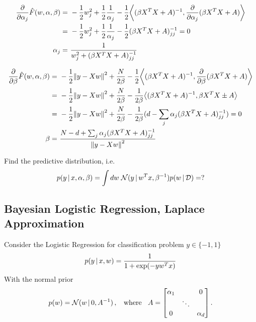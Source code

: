 \begin{align}
    \deriv{}{\alpha_j}\hat{F}(w,\alpha,\beta) =~& -\frac{1}{2}w^2_j + \frac{1}{2}\frac{1}{\alpha_j} - \frac{1}{2} \inner{(\beta X^TX + A)^{-1}}{\deriv{}{\alpha_j}(\beta X^TX + A)} \\
    =~& -\frac{1}{2}w^2_j+ \frac{1}{2}\frac{1}{\alpha_j} - \frac{1}{2} (\beta X^TX + A)^{-1}_{jj} = 0\\
    \alpha_j =~& \frac{1}{w_j^2 + (\beta X^TX + A)^{-1}_{jj}}
\end{align}

\begin{align}
    \deriv{}{\beta}\hat{F}(w,\alpha,\beta) =~& -\frac{1}{2}\norm{y - Xw}^2 + \frac{N}{2\beta} - \frac{1}{2}\inner{(\beta X^TX + A)^{-1}}{\deriv{}{\beta}(\beta X^TX + A)}\\
    =~& -\frac{1}{2}\norm{y - Xw}^2 + \frac{N}{2\beta} - \frac{1}{2\beta}\inner{(\beta X^TX + A)^{-1}}{\beta X^TX \pm A}\\
    =~& -\frac{1}{2}\norm{y - Xw}^2 + \frac{N}{2\beta} - \frac{1}{2\beta}(d - \sum_j\alpha_j (\beta X^TX + A)^{-1}_{jj}) = 0\\
    \beta =~& \frac{N - d + \sum_j\alpha_j (\beta X^TX + A)^{-1}_{jj}}{\norm{y - Xw}^2}
\end{align}

\begin{exercise}
    Find the predictive distribution, i.e.
    \begin{align}
        p(y\,|\, x,\alpha,\beta)= \int dw\; \mathcal{N}(y\,|\, w^Tx, \beta^{-1})p(w\,|\, \mathcal{D}) = ?
    \end{align}
\end{exercise}

\subsection{Bayesian Logistic Regression, Laplace Approximation}

Consider the Logistic Regression for classification problem $y \in \{-1,1\}$
\begin{align}
    p(y\,|\, x,w) = \frac{1}{1+\exp(-yw^Tx)}
\end{align}
With the normal prior
\begin{align}
    p(w) = \Normal(w\cond 0, A^{-1})\,,\;\;\text{ where }\;\; 
    A = \begin{bmatrix}
        \alpha_1 & & 0\\
        & \ddots & \\
        0 & & \alpha_d
    \end{bmatrix}\,.
\end{align}

